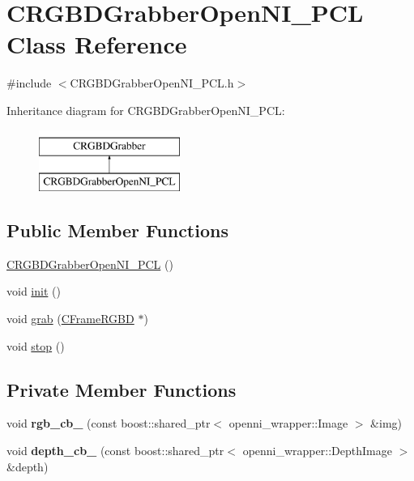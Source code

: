 \hypertarget{class_c_r_g_b_d_grabber_open_n_i___p_c_l}{
\section{CRGBDGrabberOpenNI\_\-PCL Class Reference}
\label{class_c_r_g_b_d_grabber_open_n_i___p_c_l}
}


{\ttfamily \#include $<$CRGBDGrabberOpenNI\_\-PCL.h$>$}

Inheritance diagram for CRGBDGrabberOpenNI\_\-PCL:\begin{figure}[H]
\begin{center}
\leavevmode
\includegraphics[height=2.000000cm]{class_c_r_g_b_d_grabber_open_n_i___p_c_l}
\end{center}
\end{figure}
\subsection*{Public Member Functions}
\begin{DoxyCompactItemize}
\item 
\hyperlink{class_c_r_g_b_d_grabber_open_n_i___p_c_l_a74e58381667d17469ed2538942ae4642}{CRGBDGrabberOpenNI\_\-PCL} ()
\item 
void \hyperlink{class_c_r_g_b_d_grabber_open_n_i___p_c_l_abffd24f81fc9d0668ade3fae4a610a5b}{init} ()
\item 
void \hyperlink{class_c_r_g_b_d_grabber_open_n_i___p_c_l_ab01be725fe3388898a9bad48aa6e15bb}{grab} (\hyperlink{class_c_frame_r_g_b_d}{CFrameRGBD} $\ast$)
\item 
void \hyperlink{class_c_r_g_b_d_grabber_open_n_i___p_c_l_a7ed8695258084e50b76241fe8543f527}{stop} ()
\end{DoxyCompactItemize}
\subsection*{Private Member Functions}
\begin{DoxyCompactItemize}
\item 
\hypertarget{class_c_r_g_b_d_grabber_open_n_i___p_c_l_ac3f9cbbb50f43bb162a981226e5c86d5}{
void {\bfseries rgb\_\-cb\_\-} (const boost::shared\_\-ptr$<$ openni\_\-wrapper::Image $>$ \&img)}
\label{class_c_r_g_b_d_grabber_open_n_i___p_c_l_ac3f9cbbb50f43bb162a981226e5c86d5}

\item 
\hypertarget{class_c_r_g_b_d_grabber_open_n_i___p_c_l_ac6bdc65fa81bd86e7f22d3f8b70da079}{
void {\bfseries depth\_\-cb\_\-} (const boost::shared\_\-ptr$<$ openni\_\-wrapper::DepthImage $>$ \&depth)}
\label{class_c_r_g_b_d_grabber_open_n_i___p_c_l_ac6bdc65fa81bd86e7f22d3f8b70da079}

\end{DoxyCompactItemize}
